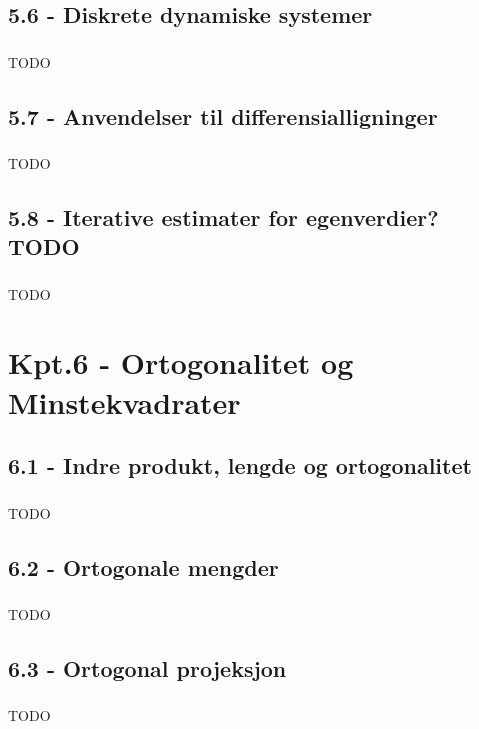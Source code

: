 \documentclass{article}
\begin{document}
    \subsection{5.6 - Diskrete dynamiske systemer}
      \subsubsection{}
        TODO
    \subsection{5.7 - Anvendelser til differensialligninger}
      \subsubsection{}
        TODO
    \subsection{5.8 - Iterative estimater for egenverdier? TODO}
      \subsubsection{}
        TODO
  \section{Kpt.6 - Ortogonalitet og Minstekvadrater}
    \subsection{6.1 - Indre produkt, lengde og ortogonalitet}
      \subsubsection{}
        TODO
    \subsection{6.2 - Ortogonale mengder}
      \subsubsection{}
        TODO
    \subsection{6.3 - Ortogonal projeksjon}
      \subsubsection{}
        TODO
\end{document}
